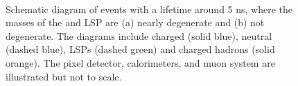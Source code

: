 \begin{figure}[h!]
\centering
{}\\
\caption{Schematic diagram of \rhadron events with a lifetime around 5 ns, where the masses of the \rhadron and \acs*{LSP} are (a) nearly degenerate and (b) not degenerate. The diagrams include charged \rhadrons (solid blue), neutral \rhadrons (dashed blue), \acp{LSP} (dashed green) and charged hadrons (solid orange). The pixel detector, calorimeters, and muon system are illustrated but not to scale.}
\label{fig:rhadron_disappear}
\end{figure}

